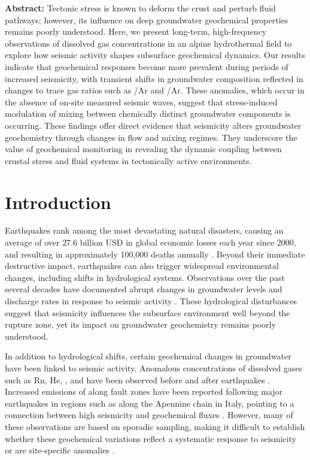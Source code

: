 \noindent
\textbf{Abstract:} Tectonic stress is known to deform the crust and perturb fluid pathways; however, its influence on deep groundwater geochemical properties remains poorly understood.
Here, we present long-term, high-frequency observations of dissolved gas concentrations in an alpine hydrothermal field to explore how seismic activity shapes subsurface geochemical dynamics.
Our results indicate that geochemical responses become more prevalent during periods of increased seismicity, with transient shifts in groundwater composition reflected in changes to trace gas ratios such as /Ar and /Ar.
These anomalies, which occur in the absence of on-site measured seismic waves, suggest that stress-induced modulation of mixing between chemically distinct groundwater components is occurring.
These findings offer direct evidence that seismicity alters groundwater geochemistry through changes in flow and mixing regimes.
They underscore the value of geochemical monitoring in revealing the dynamic coupling between crustal stress and fluid systems in tectonically active environments.

\section{Introduction}
Earthquakes rank among the most devastating natural disasters, causing an average of over $27.6$ billion USD in global economic losses each year since 2000, and resulting in approximately 100,000 deaths annually \citep{bilham2004urban, emdat2024damage}.
Beyond their immediate destructive impact, earthquakes can also trigger widespread environmental changes, including shifts in hydrological systems.
Observations over the past several decades have documented abrupt changes in groundwater levels and discharge rates in response to seismic activity \citep{shi2013coseismic, montgomery2003streamflow, king2002earthquake, curzi2024fossil}.
These hydrological disturbances suggest that seismicity influences the subsurface environment well beyond the rupture zone, yet its impact on groundwater geochemistry remains poorly understood.

In addition to hydrological shifts, certain geochemical changes in groundwater have been linked to seismic activity.
Anomalous concentrations of dissolved gases such as Rn, He, , and  have been observed before and after earthquakes \citep{segovia1989radon, igarashi1995radon, toutain1999seismo, gunatilake2023japan, sano2016kumamoto}.
Increased emissions of  along fault zones have been reported following major earthquakes in regions such as along the Apennine chain in Italy, pointing to a connection between high seismicity and geochemical fluxes \citep{chiodini2020co2, curzi2024fossil}.
However, many of these observations are based on sporadic sampling, making it difficult to establish whether these geochemical variations reflect a systematic response to seismicity or are site-specific anomalies \citep{toutain1999seismo}.

